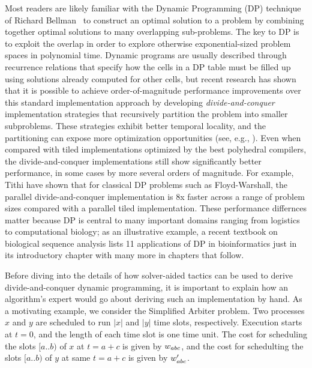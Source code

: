Most readers are likely familiar with the Dynamic Programming (DP) technique of Richard Bellman~\cite{03/Bellman:DP} to construct an optimal solution to a problem by combining together optimal solutions to many overlapping sub-problems. The key to DP is to exploit the overlap in order to explore otherwise exponential-sized problem spaces in polynomial time. Dynamic programs are usually described through recurrence relations that specify how the cells in a DP table must be filled up using solutions already computed for other cells, but recent research has shown that it is possible to achieve order-of-magnitude performance improvements over this standard implementation approach by developing \emph{divide-and-conquer}  implementation strategies that recursively
partition the problem into smaller subproblems.  These strategies exhibit better temporal locality, and the partitioning can expose more
optimization opportunities (see, e.g., \cite{IPDPS15/Tithi}).  Even when compared with tiled implementations optimized by the best polyhedral compilers, 
the divide-and-conquer implementations still show significantly better performance, in some cases by more several orders of magnitude. For example, Tithi \etal{} have shown that for classical DP problems such as Floyd-Warshall, the parallel divide-and-conquer implementation is  8x faster  across a range of problem sizes compared with a parallel tiled implementation\cite{IPDPS15/Tithi}. These performance differnces matter because  DP is central to many important domains ranging from logistics to computational biology; as an illustrative example, a recent textbook \cite{DurbinEdKr98} on biological sequence analysis lists 11 applications of DP in bioinformatics just in its introductory chapter with many more in chapters that follow.



Before diving into the details of how solver-aided tactics can be used to derive divide-and-conquer dynamic programming, it is important to explain how an algorithm's expert would go about deriving such an implementation by hand.
As a motivating example, we consider the Simplified Arbiter problem.
Two processes $x$ and $y$ are scheduled to run $|x|$ and $|y|$ time slots,
respectively. Execution starts at $t=0$, and the length of each time slot is
one time unit. The cost for scheduling the slots $[a..b)$ of $x$ at $t=a+c$
is given by $w_{abc}$, and the cost for schedulting the slots $[a..b)$ of $y$
at same $t=a+c$ is given by $w'_{abc}$.

